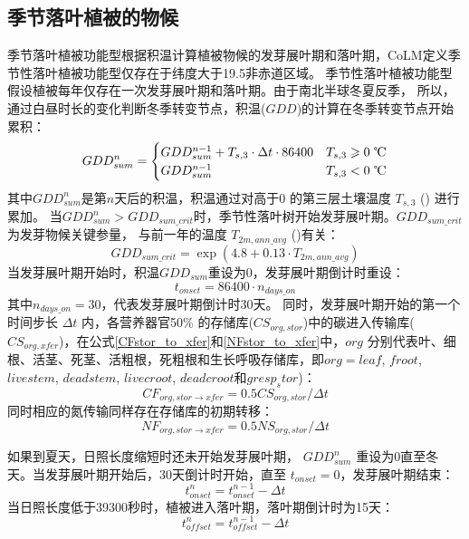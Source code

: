 \subsection{季节落叶植被的物候}\label{季节落叶植被的物候}
季节落叶植被功能型根据积温计算植被物候的发芽展叶期和落叶期，CoLM定义季节性落叶植被功能型仅存在于纬度大于19.5\textdegree 非赤道区域。
季节性落叶植被功能型假设植被每年仅存在一次发芽展叶期和落叶期。由于南北半球冬夏反季，
所以，通过白昼时长的变化判断冬季转变节点，积温($GDD$)的计算在冬季转变节点开始累积\citep{white1997continental}：
\begin{equation}
GDD _{sum}^{n}=\begin{cases}
GDD _{sum}^{n-1}+T_{s, 3} \cdot \Delta t \cdot 86400 & T_{s, 3} \geqslant \text{0 \textcelsius} \\ 
GDD _{sum}^{n-1} & T_{s, 3}< \text{0 \textcelsius}
\end{cases}
\end{equation}
其中$GDD_{sum}^n$是第$n$天后的积温，积温通过对高于0 \textcelsius 的第三层土壤温度 $T_{s,3}$ (\textcelsius) 进行累加。
当$GDD_{sum}^n>{GDD}_{sum\_{crit}}$时，季节性落叶树开始发芽展叶期。${GDD}_{sum\_{crit}}$ 为发芽物候关键参量，
与前一年的温度 $T_{2m,ann\_{avg}}$ (\textcelsius)有关：
\begin{equation}
GDD _{sum\_{crit}}=\exp \left(4.8+0.13 \cdot T_{2 m, ann\_{avg}}\right)
\end{equation}
当发芽展叶期开始时，积温${GDD}_{sum}$重设为0，发芽展叶期倒计时重设：
\begin{equation}
t_{onset}=86400 \cdot n_{days\_on}
\end{equation}
其中$n_{days\_on}=30$，代表发芽展叶期倒计时30天。
同时，发芽展叶期开始的第一个时间步长 $\Delta t$ 内，各营养器官50\% 的存储库($CS_{org,{stor}}$)中的碳进入传输库($CS_{org,{xfer}}$)，在公式\eqref{CFstor_to_xfer}和\eqref{NFstor_to_xfer}中，$org$ 分别代表叶、细根、活茎、死茎、活粗根，死粗根和生长呼吸存储库，即$org=leaf$, $froot$, $livestem$, $deadstem$, $livecroot$, $deadcroot$和$gresp_stor$)：
\begin{equation}\label{CFstor_to_xfer}
  CF_{org,{stor}\rightarrow {xfer}} = 0.5 CS_{org,{stor}}/\Delta t
\end{equation}
同时相应的氮传输同样存在存储库的初期转移：
\begin{equation}\label{NFstor_to_xfer}
  NF_{org,{stor}\rightarrow {xfer}} = 0.5  NS_{org,{stor}}/\Delta t
\end{equation}

如果到夏天，日照长度缩短时还未开始发芽展叶期，
$GDD_{sum}^n$ 重设为0直至冬天。当发芽展叶期开始后，30天倒计时开始，直至 $t_{onset}=0$，发芽展叶期结束：
%
\begin{equation}
t_{onset}^n=t_{onset}^{n-1}-\Delta t
\end{equation}
当日照长度低于39300秒时，植被进入落叶期，落叶期倒计时为15天：
\begin{equation}
  t_{offset}^n=t_{offset}^{n-1}-\Delta t
\end{equation}


